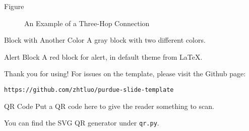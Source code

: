 \documentclass{purdue-poster}
\newlength{\postercolsep}
\newcommand{\postercolwidth}[1]{\dimeval{#1-\postercolsep}}
\begin{document}
\begin{frame}{}
\begin{columns}[onlytextwidth, t]
\begin{column}{\postercolwidth{.4\linewidth}}
\begin{plainblock}{Figure}
            {
                \centering
                \small
                \begin{figure}[h]
                    \centering
                    \caption{An Example of a Three-Hop Connection}
                    \label{fig:three-hop}
                \end{figure}
            }

        \end{plainblock}

        \begin{exampleblock}{Block with Another Color}
        A gray block with two different colors.
        \end{exampleblock}

        \begin{alertblock}{Alert Block}
        A red block for alert, in default theme from \LaTeX.
        \end{alertblock}

    \begin{plainblock}{Thank you for using!}
        For issues on the template, please visit the Github page:
        
        {\small\texttt{https://github.com/zhtluo/purdue-slide-template}\par}
    \end{plainblock}

    \begin{plainblock}{QR Code}
        Put a QR code here to give the reader something to scan.

        You can find the SVG QR generator under \texttt{qr.py}.

        \begin{figure}
            {\centering}
        \end{figure}
    \end{plainblock}
    \end{column}
    
\end{columns}
\end{frame}
\end{document}
